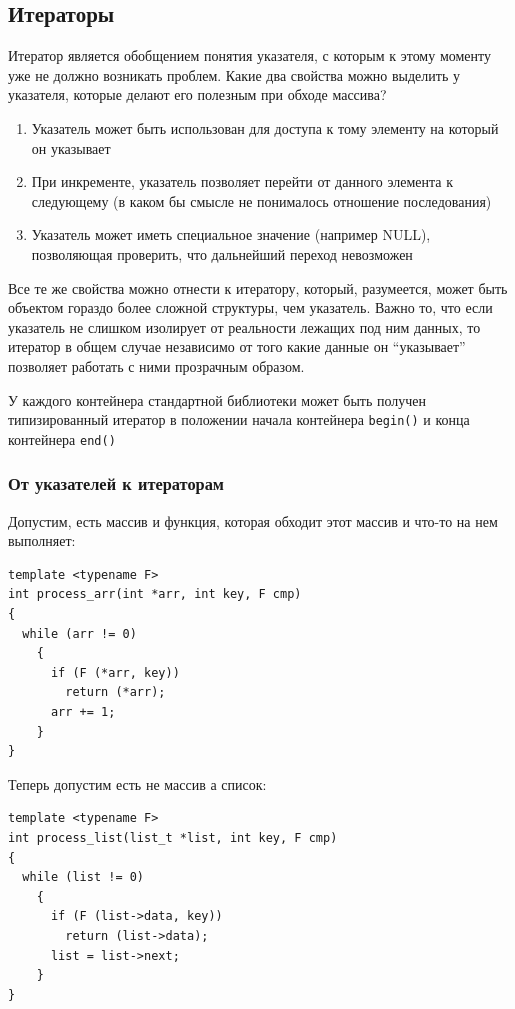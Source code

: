 \documentclass[a4paper,12pt,oneside]{article}
\begin{document}
\pagebreak
\subsection{Итераторы}\label{Iterators}

Итератор является обобщением понятия указателя, с которым к этому моменту уже не должно возникать проблем. Какие два свойства можно выделить у указателя, которые делают его полезным при обходе массива?

\begin{enumerate}
\item Указатель может быть использован для доступа к тому элементу на который он указывает
\item При инкременте, указатель позволяет перейти от данного элемента к следующему (в каком бы смысле не понималось отношение последования)
\item Указатель может иметь специальное значение (например NULL), позволяющая проверить, что дальнейший переход невозможен
\end{enumerate}

Все те же свойства можно отнести к итератору, который, разумеется, может быть объектом гораздо более сложной структуры, чем указатель. Важно то, что если указатель не слишком изолирует от реальности лежащих под ним данных, то итератор в общем случае независимо от того какие данные он ``указывает'' позволяет работать с ними прозрачным образом.

У каждого контейнера стандартной библиотеки может быть получен типизированный итератор в положении начала контейнера \lstinline!begin()! и конца контейнера \lstinline!end()!

\subsubsection{От указателей к итераторам}\label{PointersToIterators}

Допустим, есть массив и функция, которая обходит этот массив и что-то на нем выполняет:

\begin{lstlisting}
template <typename F>
int process_arr(int *arr, int key, F cmp)
{
  while (arr != 0)
    {
      if (F (*arr, key)) 
        return (*arr);
      arr += 1; 
    }  
}
\end{lstlisting}

Теперь допустим есть не массив а список:

\begin{lstlisting}
template <typename F>
int process_list(list_t *list, int key, F cmp)
{
  while (list != 0)
    {
      if (F (list->data, key)) 
        return (list->data);
      list = list->next;
    }  
}
\end{lstlisting}
\end{document}
